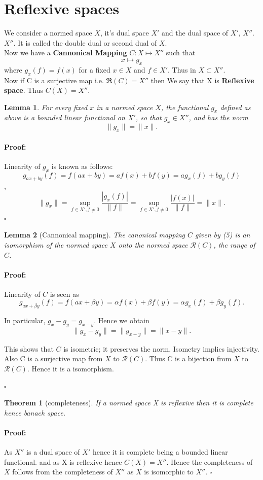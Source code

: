 \documentclass{article}
\newenvironment{proof}{\paragraph{Proof:}}{\hfill$\square$}
\newtheorem{theorem}{Theorem}[section]
\newtheorem{lemma}{Lemma}[section]
\begin{document}
\section{Reflexive spaces}
We consider a normed space $X$, it's dual space $X'$ and the dual space of $X' $, $X''$. $X''$. It is called the double dual or second dual of $X$.\\
Now we have a \textbf{Cannonical Mapping} $C: X \mapsto X''$ such that $$x \mapsto g_x$$ where $g_x(f) = f(x)$ for a fixed $x\in X $ and $f \in X'$. Thus in $X \subset X''$. 
\\ 
Now if C is a surjective map i.e. $\mathfrak{R} (C) = X''$ then We say that X is \textbf{Reflexive space}. Thus $C(X) = X''$.



\begin{lemma}
 For every fixed $x$ in a normed space $X$, the functional $g_x$ defined as above is a bounded linear functional on $X'$, so that $g_x \in X''$, and has the norm
\[
\|g_x\| = \|x\|.
\]
\end{lemma}
\begin{proof}
   Linearity of $g_x$ is known as follows:
   $$g_{ax+by}(f) = f(ax+by) = af(x) + bf(y)= ag_x(f) + bg_y(f)$$, 
\[
\|g_x\| = \sup_{f \in X', f \neq 0} \frac{|g_x(f)|}{\|f\|} = \sup_{f \in X', f \neq 0} \frac{|f(x)|}{\|f\|} = \|x\|.
\]
\end{proof}

\begin{lemma}[Cannonical mapping]
The canonical mapping $C$ given by (5) is an isomorphism of the normed space $X$ onto the normed space $\mathcal{R}(C)$, the range of $C$.

 
\end{lemma}
\begin{proof}
    Linearity of $C$ is seen as 
\[
g_{ax + \beta y}(f) = f(ax + \beta y) = \alpha f(x) + \beta f(y) = \alpha g_x(f) + \beta g_y(f).
\]

In particular, $ g_x - g_y  =  g_{x - y} $. Hence we obtain
\[
\|g_x - g_y\| = \|g_{x - y}\| = \|x - y\|.
\]

This shows that $C$ is isometric; it preserves the norm. Isometry implies injectivity. Also C is a surjective map from $X$ to $\mathcal{R}(C) $. Thus C is a bijection from $X$ to $\mathcal{R}(C) $. Hence it is a isomorphism.

\end{proof}

\begin{theorem}[completeness]
    If a normed space X is reflexive then it is complete hence banach space. 
    
\end{theorem}
\begin{proof}
    As $X''$ is a dual space of $X' $ hence it is complete being a bounded linear functional. and as X is reflexive hence $C(X) = X''$. Hence the completeness of $X$ follows from the completeness of $X''$ as $X$ is isomorphic to $X''$. 
\end{proof}
\end{document}
